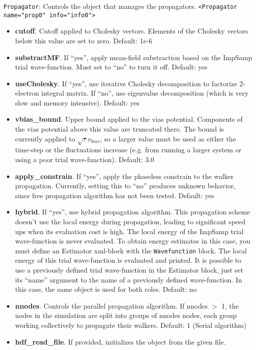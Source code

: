 \texttt{Propagator}: Controls the object that manages the propagators.
\texttt{<Propagator name="prop0" info="info0">}
\begin{itemize}
\item \textbf{cutoff}. Cutoff applied to Cholesky vectors. Elements of the Cholesky vectors below this value are set to zero.
    Default: 1e-6
\item \textbf{substractMF}. If ``yes'', apply mean-field substraction based on the ImpSamp trial wave-function. Must set to ``no'' to turn it off.
    Default: yes
\item \textbf{useCholesky}. If ``yes'', use iterative Cholesky decomposition to factorize 2-electron integral matrix. If ``no'', use eigenvalue decomposition (which is very slow and memory intensive).
    Default: yes
\item \textbf{vbias\_bound}. Upper bound applied to the vias potential. Components of the vias potential above this value are truncated there. The bound is currently applied to $\sqrt{\tau} v_{bias}$, so a larger value must be used as either the time-step or the fluctuations increase (e.g. from running a larger system or using a poor trial wave-function).
    Default: 3.0
\item \textbf{apply\_constrain}. If ``yes'', apply the phaseless constrain to the walker propagation. Currently, setting this to ``no'' produces unknown behavior, since free propagation algorithm has not been tested.
    Default: yes
\item \textbf{hybrid}. If ``yes'', use hybrid propagation algorithm. This propagation scheme doesn't use the local energy during propagation, leading to significant speed ups when its evaluation  cost is high. The local energy of the ImpSamp trial wave-function is never evaluated. To obtain energy estimates in this case, you must define an Estimator xml-block with the \texttt{Wavefunction} block. The local energy of this trial wave-function is evaluated and printed. It is possible to use a previously defined trial wave-function in the Estimator block, just set its ``name'' argument to the name of a previously defined wave-function. In this case, the same object is used for both roles.
    Default: no
\item \textbf{nnodes}. Controls the parallel propagation algorithm. If nnodes $>$ 1, the nodes in the simulation are split into groups of nnodes nodes, each group working collectively to propagate their walkers.
    Default: 1 (Serial algorithm)
\item \textbf{hdf\_read\_file}. If provided, initializes the object from the given file.

\end{itemize}
